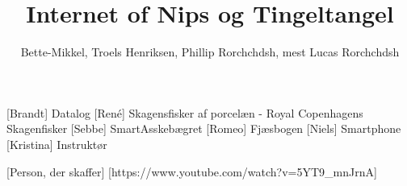 \documentclass[a4paper,11pt]{article}
\title{Internet of Nips og Tingeltangel}
\author{Bette-Mikkel, Troels Henriksen, Phillip Rorchchdsh, mest Lucas Rorchchdsh}
\begin{document}
\maketitle

\begin{roles}
  [Brandt] Datalog
  [René] Skagensfisker af porcelæn - Royal Copenhagens Skagenfisker
  [Sebbe] SmartAsskebægret
  [Romeo] Fjæsbogen
  [Niels] Smartphone
  [Kristina] Instruktør
\end{roles}

\begin{props}
  [Person, der skaffer]
  [https://www.youtube.com/watch?v=5YT9\_mnJrnA]
\end{props}
\end{document}
